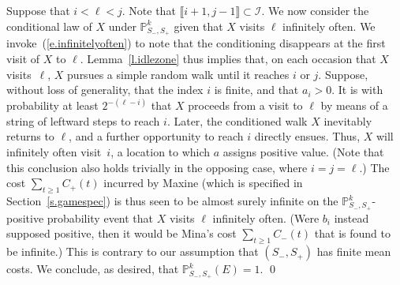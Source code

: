 \documentclass[letterpaper,11pt,oneside,reqno]{amsbook}
\newcommand{\PP}{\ensuremath{\mathbb{P}}}
\newcommand{\Z}{\ensuremath{\mathbb{Z}}}
\numberwithin{figure}{chapter}
\theoremstyle{definition}
\theoremstyle{definition}
\theoremstyle{definition}
\theoremstyle{definition}
\theoremstyle{definition}
\newcommand{\mc}{\mathcal}
\newcommand\pgameplay[3]{\PP^{#3}_{#1,#2}}
\begin{document}
Suppose that $i < \ell < j$. Note that $\llbracket i+1,j-1 \rrbracket \subset \mc{I}$. 
We now consider the conditional law of  $X$ under $\pgameplay{S_-}{S_+}{k}$ given that $X$ visits $\ell$ infinitely often. We invoke~(\ref{e.infinitelyoften}) to note that the conditioning disappears at the first visit of $X$ to $\ell$.
Lemma~\ref{l.idlezone} thus implies that,
on each occasion that $X$ visits~$\ell$, $X$ pursues a simple random walk until it reaches $i$ or $j$. 
 Suppose, without loss of generality, that the index $i$ is finite, and that $a_i > 0$. It is with probability at least $2^{-(\ell-i)}$ that $X$ proceeds from a visit to $\ell$ by means of a string of leftward steps to reach $i$. Later, the conditioned walk $X$ inevitably returns to $\ell$, and a further opportunity to reach $i$ directly ensues. 
 Thus, $X$ will infinitely often visit~$i$, a location to which  $a$ assigns positive value.
(Note that this conclusion also holds trivially in the opposing case, where $i=j=\ell$.)
 The cost $\sum_{t \geq 1} C_+(t)$ incurred by Maxine
(which is specified in Section~\ref{s.gamespec})
is thus seen to be almost surely infinite on the  $\pgameplay{S_-}{S_+}{k}$-positive probability event that $X$ visits $\ell$ infinitely often.
(Were $b_i$ instead supposed positive, then it would be Mina's cost  $\sum_{t \geq 1}C_-(t)$ that is found to be infinite.) This is contrary to our assumption that $(S_-,S_+)$ has finite mean costs. We conclude, as desired, that $\pgameplay{S_-}{S_+}{k}(E) = 1$. \qed
\end{document}
